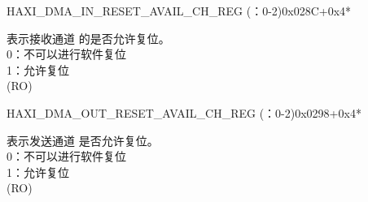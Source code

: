 \begin{register}{H}{AXI\_DMA\_IN\_RESET\_AVAIL\_CH\_REG (：0-2)}{0x028C+0x4*}\label{regdesc:AXIDMAINRESETAVAILCHNREG}
%
%
\regnewline%
\begin{regdesc}\begin{reglist}
\label{fielddesc:AXIDMAINRESETAVAILCHN}\item [AXI\_DMA\_IN\_RESET\_AVAIL\_CH\regindex{n}] 表示接收通道  的是否允许复位。\\
0：不可以进行软件复位\\
1：允许复位\\ (RO)
\end{reglist}\end{regdesc}
\end{register}


\begin{register}{H}{AXI\_DMA\_OUT\_RESET\_AVAIL\_CH\_REG (：0-2)}{0x0298+0x4*}\label{regdesc:AXIDMAOUTRESETAVAILCHNREG}
%
%
\regnewline%
\begin{regdesc}\begin{reglist}
\label{fielddesc:AXIDMAOUTRESETAVAILCHN}\item [AXI\_DMA\_OUT\_RESET\_AVAIL\_CH\regindex{n}] 表示发送通道  是否允许复位。\\
0：不可以进行软件复位\\
1：允许复位\\  (RO)
\end{reglist}\end{regdesc}
\end{register}


